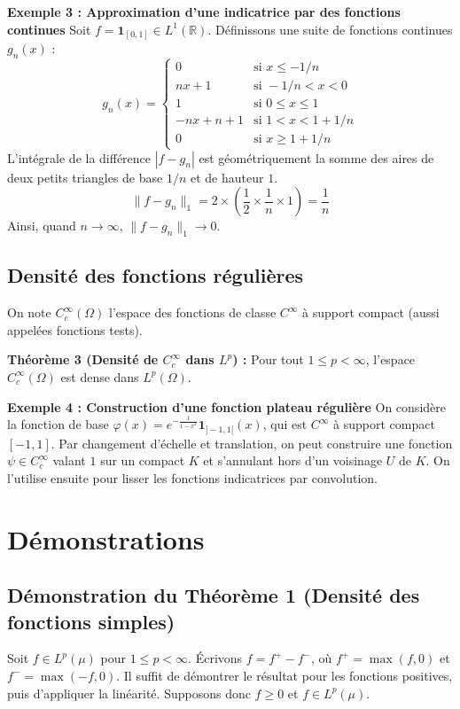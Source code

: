 \documentclass[11pt,a4paper]{article}
\begin{document}
\textbf{Exemple 3 : Approximation d'une indicatrice par des fonctions continues}
Soit $f = \mathbf{1}_{[0,1]} \in L^1(\mathbb{R})$.
Définissons une suite de fonctions continues $g_n(x)$ :
$$
g_n(x) = \begin{cases}
0 & \text{si } x \le -1/n \\
nx + 1 & \text{si } -1/n < x < 0 \\
1 & \text{si } 0 \le x \le 1 \\
-nx + n + 1 & \text{si } 1 < x < 1+1/n \\
0 & \text{si } x \ge 1+1/n
\end{cases}
$$
L'intégrale de la différence $|f - g_n|$ est géométriquement la somme des aires de deux petits triangles de base $1/n$ et de hauteur $1$.
$$ \| f - g_n \|_1 = 2 \times \left( \frac{1}{2} \times \frac{1}{n} \times 1 \right) = \frac{1}{n} $$
Ainsi, quand $n \to \infty$, $\| f - g_n \|_1 \to 0$.

\subsection{Densité des fonctions régulières}

On note $C_c^\infty(\Omega)$ l'espace des fonctions de classe $C^\infty$ à support compact (aussi appelées fonctions tests).

\textbf{Théorème 3 (Densité de $C_c^\infty$ dans $L^p$) :}
Pour tout $1 \le p < \infty$, l'espace $C_c^\infty(\Omega)$ est dense dans $L^p(\Omega)$.

\textbf{Exemple 4 : Construction d'une fonction plateau régulière}
On considère la fonction de base $\varphi(x) = e^{-\frac{1}{1-x^2}} \mathbf{1}_{]-1,1[}(x)$, qui est $C^\infty$ à support compact $[-1, 1]$.
Par changement d'échelle et translation, on peut construire une fonction $\psi \in C_c^\infty$ valant $1$ sur un compact $K$ et s'annulant hors d'un voisinage $U$ de $K$. On l'utilise ensuite pour lisser les fonctions indicatrices par convolution.

\section{Démonstrations}

\subsection{Démonstration du Théorème 1 (Densité des fonctions simples)}

Soit $f \in L^p(\mu)$ pour $1 \le p < \infty$.
Écrivons $f = f^+ - f^-$, où $f^+ = \max(f, 0)$ et $f^- = \max(-f, 0)$. Il suffit de démontrer le résultat pour les fonctions positives, puis d'appliquer la linéarité.
Supposons donc $f \ge 0$ et $f \in L^p(\mu)$.
\end{document}
